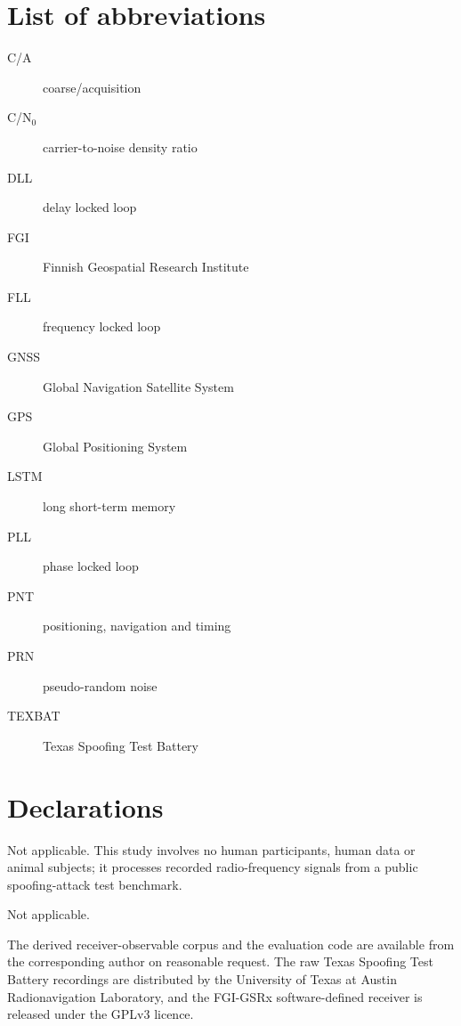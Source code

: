 \documentclass[pdflatex,sn-basic]{sn-jnl}
\theoremstyle{thmstyleone}
\theoremstyle{thmstyletwo}
\theoremstyle{thmstylethree}
\begin{document}
\maketitle










\backmatter

\section*{List of abbreviations}
\begin{description}
\item[C/A] coarse/acquisition
\item[C/N$_0$] carrier-to-noise density ratio
\item[DLL] delay locked loop
\item[FGI] Finnish Geospatial Research Institute
\item[FLL] frequency locked loop
\item[GNSS] Global Navigation Satellite System
\item[GPS] Global Positioning System
\item[LSTM] long short-term memory
\item[PLL] phase locked loop
\item[PNT] positioning, navigation and timing
\item[PRN] pseudo-random noise
\item[TEXBAT] Texas Spoofing Test Battery
\end{description}

\section*{Declarations}

Not applicable. This study involves no human participants, human data or animal
subjects; it processes recorded radio-frequency signals from a public spoofing-attack
test benchmark.

Not applicable.

The derived receiver-observable corpus and the evaluation code are available from the
corresponding author on reasonable request. The raw Texas Spoofing Test Battery
recordings are distributed by the University of Texas at Austin Radionavigation
Laboratory, and the FGI-GSRx software-defined receiver is released under the GPLv3
licence.
\end{document}
